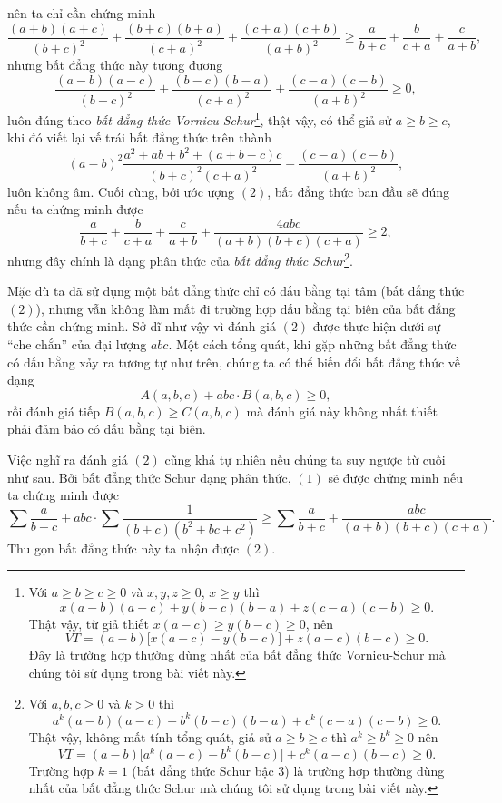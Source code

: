 \begin{bt}
{	nên ta chỉ cần chứng minh
		$$\dfrac{(a+b)(a+c)}{(b+c)^2}+\dfrac{(b+c)(b+a)}{(c+a)^2}+\dfrac{(c+a)(c+b)}{(a+b)^2} \geqslant \dfrac{a}{b+c}+\dfrac{b}{c+a}+\dfrac{c}{a+b},$$
	nhưng bất đẳng thức này tương đương
		$$\dfrac{(a-b)(a-c)}{(b+c)^2}+\dfrac{(b-c)(b-a)}{(c+a)^2}+\dfrac{(c-a)(c-b)}{(a+b)^2} \geqslant 0,$$
	luôn đúng theo \textit{bất đẳng thức Vornicu-Schur}\footnote{Với $a\geq b\geq c\geq 0$ và $x,y,z\geq 0$, $x\geq y$ thì
	$$x(a-b)(a-c)+y(b-c)(b-a)+z(c-a)(c-b)\geq 0.$$
	Thật vậy, từ giả thiết $x(a-c)\geq y(b-c)\geq 0$, nên 
	$$VT=(a-b)\bigl[x(a-c)-y(b-c)\bigr]+z(a-c)(b-c)\geq 0.$$
	Đây là trường hợp thường dùng nhất của bất đẳng thức Vornicu-Schur mà chúng tôi sử dụng trong bài viết này.}, thật vậy, có thể giả sử $a\geqslant b \geqslant c$, khi đó viết lại vế trái bất đẳng thức trên thành
		$$(a-b)^2 \dfrac{a^2+ab+b^2+(a+b-c)c}{(b+c)^2(c+a)^2}+\dfrac{(c-a)(c-b)}{(a+b)^2},$$
	luôn không âm. Cuối cùng, bởi ước ượng $(2)$, bất đẳng thức ban đầu sẽ đúng nếu ta chứng minh được
		$$\dfrac{a}{b+c}+\dfrac{b}{c+a}+\dfrac{c}{a+b}+\dfrac{4abc}{(a+b)(b+c)(c+a)} \geqslant 2,$$
	nhưng đây chính là dạng phân thức của \textit{bất đẳng thức Schur}\footnote{Với $a,b,c\geq 0$ và $k>0$ thì
	$$a^k(a-b)(a-c)+b^k(b-c)(b-a)+c^k(c-a)(c-b)\geq 0.$$
	Thật vậy, không mất tính tổng quát, giả sử $a\geq b\geq c$ thì $a^k\geq b^k\geq 0$ nên 
	$$VT=(a-b)\bigl[a^k(a-c)-b^k(b-c)\bigr]+c^k(a-c)(b-c)\geq 0.$$
	Trường hợp $k=1$ (bất đẳng thức Schur bậc 3) là trường hợp thường dùng nhất của bất đẳng thức Schur mà chúng tôi sử dụng trong bài viết này.}.
}
\begin{nx}
	Mặc dù ta đã sử dụng một bất đẳng thức chỉ có dấu bằng tại tâm (bất đẳng thức $(2)$), nhưng vẫn không làm mất đi trường hợp dấu bằng tại biên của bất đẳng thức cần chứng minh. Sở dĩ như vậy vì đánh giá $(2)$ được thực hiện dưới sự ``che chắn'' của đại lượng $abc$. Một cách tổng quát, khi gặp những bất đẳng thức có dấu bằng xảy ra tương tự như trên, chúng ta có thể biến đổi bất đẳng thức về dạng
		$$A(a,b,c)+abc\cdot B(a,b,c) \geqslant 0,$$
	rồi đánh giá tiếp $B(a,b,c)\geqslant C(a,b,c)$ mà đánh giá này không nhất thiết phải đảm bảo có dấu bằng tại biên.
\end{nx}
\begin{nx}
	Việc nghĩ ra đánh giá $(2)$ cũng khá tự nhiên nếu chúng ta suy ngược từ cuối như sau. Bởi bất đẳng thức Schur dạng phân thức, $(1)$ sẽ được chứng minh nếu ta chứng minh được
		$$\sum \dfrac{a}{b+c} +abc\cdot \sum \dfrac{1}{(b+c)(b^2+bc+c^2)} \geqslant \sum \dfrac{a}{b+c}+\dfrac{abc}{(a+b)(b+c)(c+a)}.$$
	Thu gọn bất đẳng thức này ta nhận được $(2)$.

\end{nx}
\end{bt}
